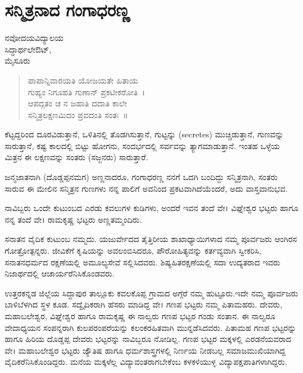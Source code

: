 \chapter{ಸನ್ಮಿತ್ರನಾದ ಗಂಗಾಧರಣ್ಣ}

\begin{center}
\smallskip

ನವೋದಯವಿದ್ಯಾಲಯ\\
ಸಿದ್ಧಾರ್ಥಲೇಔಟ್,\\ 
ಮೈಸೂರು
\addrule
\end{center}

\begin{verse}
ಪಾಪಾನ್ನಿವಾರಯತಿ ಯೋಜಯತೇ ಹಿತಾಯ\\
ಗುಹ್ಯಂ ನಿಗೂಹತಿ ಗುಣಾನ್ ಪ್ರಕಟೀಕರೋತಿ~।\\
ಆಪದ್ಗತಂ ಚ ನ ಜಹಾತಿ ದದಾತಿ ಕಾಲೇ\\
ಸನ್ಮಿತ್ರಲಕ್ಷಣಮಿದಂ ಪ್ರವದಂತಿ ಸಂತಃ~॥
\end{verse}
ಕೆಟ್ಟದ್ದರಿಂದ ದೂರವಿಡುತ್ತಾನೆ, ಒಳಿತಿನಲ್ಲಿ ತೊಡಗಿಸುತ್ತಾನೆ, ಗುಟ್ಟನ್ನು (secretes) ಮುಚ್ಚಿಡುತ್ತಾನೆ, ಗುಣವನ್ನು ಸಾರುತ್ತಾನೆ, ಕಷ್ಟ ಕಾಲದಲ್ಲಿ ಬಿಟ್ಟು ಹೋಗನು, ಸಂದರ್ಭದಲ್ಲಿ ಸರ್ವವನ್ನು ತ್ಯಾಗಮಾಡುತ್ತಾನೆ. ಇಂತಹ ಒಳ್ಳೆಯ ಮಿತ್ರನ ಈ ಲಕ್ಷಣವನ್ನು ಸಂತರು (ಸಜ್ಜನರು) ಸಾರುತ್ತಾರೆ. 

ಜನ್ಮಜಾತನಾಗಿ (ದೊಡ್ಡಪ್ಪನಮಗ) ಅಣ್ಣನಾದರೂ, ಗಂಗಾಧರಣ್ಣ ನನಗೆ ಒದಗಿ ಬಂದಿದ್ದು ಸನ್ಮಿತ್ರನಾಗಿ, ಸಂತರು ಸಾರುವ ಈ ಮೇಲಿನ ಸನ್ಮಿತ್ರನ ಗುಣಗಳು ನನ್ನ ಪಾಲಿಗೆ ಅವನಿಂದ ಪ್ರಕಟವಾಗಿದೆಯೆಂದರೆ, ಅದು ವಾಸ್ತವಾನುಭವ.

ನಾವಿಬ್ಬರು ಒಂದೇ ಕುಟುಂಬದ ಎರಡು ಕವಲುಗಳ ಕುಡಿಗಳು, ಅಂದರೆ ಇವನ ತಂದೆ ವೇ। ವಿಘ್ನೇಶ್ವರ ಭಟ್ಟರು ಹಾಗೂ ನನ್ನ ತಂದೆ ವೇ। ರಾಮಕೃಷ್ಣ ಭಟ್ಟರು ಅಣ್ಣತಮ್ಮಂದಿರು.

ಸನಾತನ ವೈದಿಕ ಕುಟುಂಬ ನಮ್ಮದು. ಯಜುರ್ವೇದದ  ತೈತ್ತಿರೀಯ ಶಾಖಾಧ್ಯಾಯಿಗಳಾದ ನಮ್ಮ  ಪೂರ್ವಜರು ಆಂಗಿರಸ ಗೋತ್ರೋತ್ಪನ್ನರು. ಜೀವಿಕೆಗೆ ಕೃಷಿಯನ್ನು ಅವಲಂಬಿಸಿದರೂ, ಪೌರೋಹಿತ್ಯವನ್ನು ಕರ್ತವ್ಯವಾಗಿ ಸ್ವೀಕರಿಸಿ, ಸನಾತನಧರ್ಮದ ರಕ್ಷಣೆಯಲ್ಲಿ ಅಮೂಲ್ಯಸೇವೆ ಸಲ್ಲಿಸಿದವರು. ಶಿಷ್ಯಹಿತರಕ್ಷಣೆಯಲ್ಲಿ  ಸದಾ ಉದ್ಯತರಾದ ಇವರು ನಿಜಾರ್ಥದಲ್ಲಿ ಆಚಾರ್ಯರೆನಿಸಿಕೊಂಡವರು. 

ಉತ್ತರಕನ್ನಡ ಜಿಲ್ಲೆಯ ಸಿದ್ದಾಪುರ ತಾಲ್ಲೂಕು ಕವಲಕೊಪ್ಪ ಗ್ರಾಮದ ಅಗ್ಗೆರೆ ನಮ್ಮ ಹುಟ್ಟೂರು.ಇದೇ ನಮ್ಮ ಪೂರ್ವಜರು ಬಾಳಿಬೆಳಗಿದ ಸ್ಥಳ ಕೂಡ. ಸದ್ವೈದಿಕರಾಗಿ ಹೆಸರು ಮಾಡಿದ್ದ ವೇ। ಗಣಪ ಭಟ್ಟರು ನಮ್ಮ  ಪಿತಾಮಹರು. ದೇವರು, ಮಹಾಬಲೇಶ್ವರ, ವಿಘ್ನೇಶ್ವರ ಹಾಗೂ ರಾಮಕೃಷ್ಣ ಈ ನಾಲ್ವರು ಗಣಪ ಭಟ್ಟರ ಗಂಡು ಸಂತಾನ. ಈ ನಾಲ್ವರೂ ವೇದಾಧ್ಯಯನ ಸಂಪನ್ನರಾಗಿ ಕುಲಪರಂಪರೆಯನ್ನು ಕಲಂಕರಹಿತವಾಗಿ ಮುನ್ನಡೆಸಿದವರು. ಪಿತಾಮಹ ಗಣಪ ಭಟ್ಟರನ್ನು ಹಾಗೂ ಹಿರಿಯ ದೊಡ್ಡಪ್ಪ ದೇವರು ಭಟ್ಟರನ್ನು ನಾವಿಬ್ಬರೂ ನೋಡಿಲ್ಲ. ಗಣಪ ಭಟ್ಟರ ಮಕ್ಕಳಲ್ಲಿ ಎರಡನೆಯವರಾದ ವೇ। ಮಹಾಬಲೇಶ್ವರ ಭಟ್ಟರು ಜ್ಯೌತಿಷ ಹಾಗೂ ಧರ್ಮಶಾಸ್ತ್ರಗಳಲ್ಲಿ ನಿರ್ಣಯ ನೀಡಬಲ್ಲ ಸಮಾಜಮುಖಿಯಾಗಿದ್ದ ವೈದಿಕರೆನಿಸಿಕೊಂಡಿದ್ದರು. ಮನೆಯ ಮಕ್ಕಳೆಲ್ಲ ವಿದ್ಯಾವಂತರಾಗಬೇಕೆಂಬ ಕಳಕಳಿಯುಳ್ಳ ವಿದ್ಯಾಪಕ್ಷಪಾತಿಗಳಾಗಿದ್ದರು.

